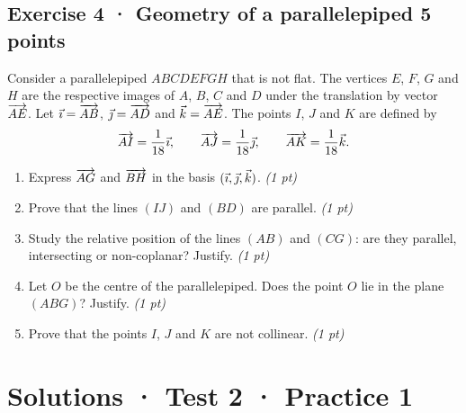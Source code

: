 \subsection*{Exercise 4 · Geometry of a parallelepiped \hfill 5 points}Consider a parallelepiped $ABCDEFGH$ that is not flat. The vertices $E$, $F$, $G$ and $H$ are the respective images of $A$, $B$, $C$ and $D$ under the translation by vector $\overrightarrow{AE}$.
Let $\vec{\imath}=\overrightarrow{AB}$, $\vec{\jmath}=\overrightarrow{AD}$ and $\vec k=\overrightarrow{AE}$.
The points $I$, $J$ and $K$ are defined by
\[\overrightarrow{AI}=\frac1{18}\vec{\imath},\qquad\overrightarrow{AJ}=\frac1{18}\vec{\jmath},\qquad\overrightarrow{AK}=\frac1{18}\vec k.\]

\begin{enumerate}

\item Express $\overrightarrow{AG}$ and $\overrightarrow{BH}$ in the basis $(\vec{\imath},\vec{\jmath},\vec k)$. \hfill\textit{(1 pt)}

\item Prove that the lines $(IJ)$ and $(BD)$ are parallel. \hfill\textit{(1 pt)}

\item Study the relative position of the lines $(AB)$ and $(CG)$: are they parallel, intersecting or non-coplanar? Justify. \hfill\textit{(1 pt)}

\item Let $O$ be the centre of the parallelepiped. Does the point $O$ lie in the plane $(ABG)$? Justify. \hfill\textit{(1 pt)}

\item Prove that the points $I$, $J$ and $K$ are not collinear. \hfill\textit{(1 pt)}

\end{enumerate}

\ifprof\clearpage

\section*{Solutions · Test 2 · Practice 1}\label{cor:2-1}

